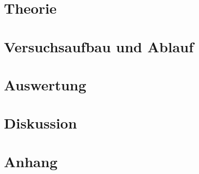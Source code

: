 \documentclass[a4,11pt]{article}
\newcommand{\V}{V402}
\begin{document}



\tableofcontents
\clearpage


\section{Theorie}

\clearpage


\section{Versuchsaufbau und Ablauf}

\clearpage


\section{Auswertung}
%
%

\clearpage


\section{Diskussion}


\clearpage
\section{Anhang}
\listoftodos
\listoffigures
\listoftables
\nocite{\V}
\printbibliography[title = Literaturverzeichnis]
\end{document}
